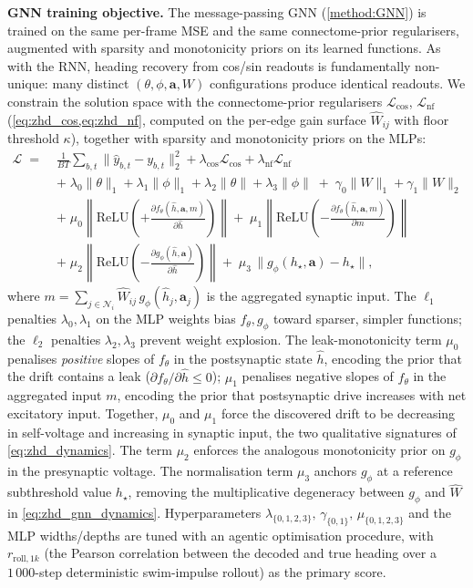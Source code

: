 \documentclass[11pt]{article}
\def\relu{\mathrm{ReLU}}
\begin{document}
\bigskip
\noindent\textbf{GNN training objective.}
The message-passing GNN (\cref{method:GNN}) is trained on the same per-frame
MSE and the same connectome-prior regularisers, augmented with sparsity and
monotonicity priors on its learned functions. As with the RNN, heading
recovery from cos/sin readouts is fundamentally non-unique: many distinct
$(\theta,\phi,\mathbf a,W)$ configurations produce identical readouts. We
constrain the solution space with the connectome-prior regularisers
$\mathcal{L}_{\mathrm{cos}}$, $\mathcal{L}_{\mathrm{nf}}$
(\cref{eq:zhd_cos,eq:zhd_nf}, computed on the per-edge gain surface
$\hat W_{ij}$ with floor threshold $\kappa$), together with sparsity
and monotonicity priors on the MLPs:
\begin{align}
\mathcal{L} \;=\;&
  \tfrac{1}{BT}\sum_{b,t}\|\hat y_{b,t} - y_{b,t}\|_2^2
+ \lambda_{\mathrm{cos}}\mathcal{L}_{\mathrm{cos}}
+ \lambda_{\mathrm{nf}}\mathcal{L}_{\mathrm{nf}} \nonumber\\
& +\;\lambda_0\|\theta\|_1 + \lambda_1\|\phi\|_1
   + \lambda_2\|\theta\| + \lambda_3\|\phi\|
   \;+\;\gamma_0\|W\|_1 + \gamma_1\|W\|_2 \nonumber\\
& +\;\mu_0\!\left\|
       \relu\!\left(+\tfrac{\partial f_\theta(\hat h,\mathbf a,m)}
                          {\partial \hat h}\right)\right\|
   +\;\mu_1\!\left\|
       \relu\!\left(-\tfrac{\partial f_\theta(\hat h,\mathbf a,m)}
                          {\partial m}\right)\right\| \nonumber\\
& +\;\mu_2\!\left\|
       \relu\!\left(-\tfrac{\partial g_\phi(\hat h,\mathbf a)}
                          {\partial \hat h}\right)\right\|
   +\;\mu_3\,\big\|g_\phi(h_\star,\mathbf a)-h_\star\big\|,
\label{eq:zhd_gnn_loss}
\end{align}
where $m = \sum_{j \in \mathcal N_i}\hat W_{ij}\,
g_\phi(\hat h_j,\mathbf a_j)$ is the aggregated synaptic input. The
$\ell_1$ penalties $\lambda_0,\lambda_1$ on the MLP weights bias
$f_\theta, g_\phi$ toward sparser, simpler functions; the $\ell_2$
penalties $\lambda_2,\lambda_3$ prevent weight explosion. The
leak-monotonicity term $\mu_0$ penalises \emph{positive} slopes of
$f_\theta$ in the postsynaptic state $\hat h$, encoding the prior
that the drift contains a leak
($\partial f_\theta / \partial \hat h \le 0$); $\mu_1$ penalises
negative slopes of $f_\theta$ in the aggregated input $m$, encoding
the prior that postsynaptic drive increases with net excitatory
input. Together, $\mu_0$ and $\mu_1$ force the discovered drift to be
decreasing in self-voltage and increasing in synaptic input, the
two qualitative signatures of \cref{eq:zhd_dynamics}. The term $\mu_2$
enforces the analogous monotonicity prior on $g_\phi$ in the
presynaptic voltage. The normalisation term $\mu_3$ anchors $g_\phi$
at a reference subthreshold value $h_\star$, removing the
multiplicative degeneracy between $g_\phi$ and $\hat W$ in
\cref{eq:zhd_gnn_dynamics}. Hyperparameters
$\lambda_{\{0,1,2,3\}},\,\gamma_{\{0,1\}},\,\mu_{\{0,1,2,3\}}$ and the
MLP widths/depths are tuned with an agentic optimisation procedure,
with $r_{\mathrm{roll},1k}$ (the Pearson correlation between the decoded
and true heading over a $1\,000$-step deterministic swim-impulse rollout)
as the primary score.
\end{document}
